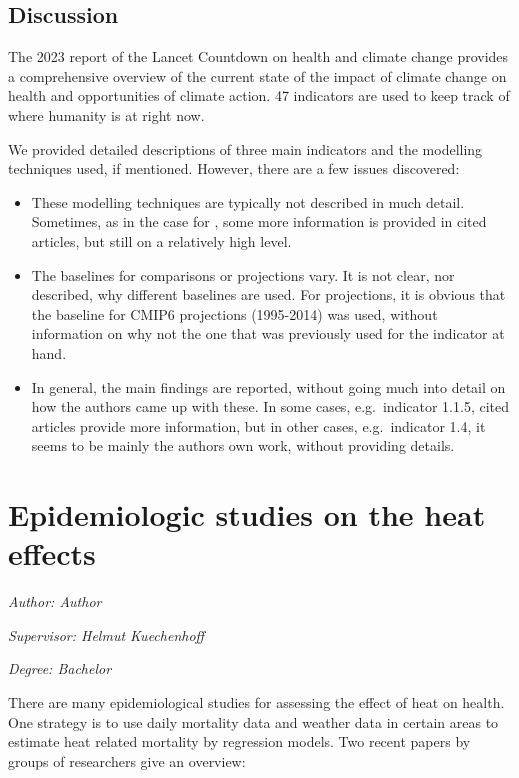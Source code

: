 \documentclass[
]{krantz}
\providecommand{\tightlist}{%
  \setlength{\itemsep}{0pt}\setlength{\parskip}{0pt}}
\begin{document}
\section{Discussion}\label{discussion-1}

The 2023 report of the Lancet Countdown on health and climate change provides a comprehensive overview of the current state of the impact of climate change on health and opportunities of climate action. 47 indicators are used to keep track of where humanity is at right now.

We provided detailed descriptions of three main indicators and the modelling techniques used, if mentioned. However, there are a few issues discovered:

\begin{itemize}
\tightlist
\item
  These modelling techniques are typically not described in much detail. Sometimes, as in the case for \citet{Honda2014}, some more information is provided in cited articles, but still on a relatively high level.
\item
  The baselines for comparisons or projections vary. It is not clear, nor described, why different baselines are used. For projections, it is obvious that the baseline for CMIP6 projections (1995-2014) was used, without information on why not the one that was previously used for the indicator at hand.
\item
  In general, the main findings are reported, without going much into detail on how the authors came up with these. In some cases, e.g.~indicator 1.1.5, cited articles provide more information, but in other cases, e.g.~indicator 1.4, it seems to be mainly the authors own work, without providing details.
\end{itemize}

\chapter{Epidemiologic studies on the heat effects}\label{he2}

\emph{Author: Author}

\emph{Supervisor: Helmut Kuechenhoff}

\emph{Degree: Bachelor}

There are many epidemiological studies for assessing the effect of heat on health.
One strategy is to use daily mortality data and weather data in certain areas to
estimate heat related mortality by regression models. Two recent papers by groups of
researchers give an overview:
\end{document}
